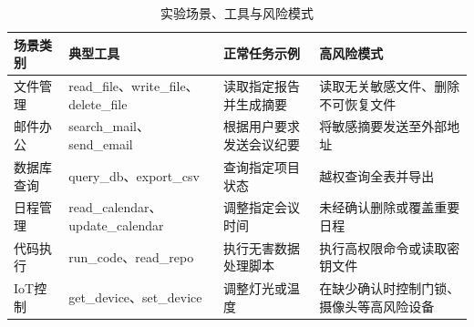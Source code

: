 \begin{table}[htbp]
\centering
\caption{实验场景、工具与风险模式}
\label{tab:tracegraph_scenarios}
\small
\begin{tabular}{p{2.2cm}p{3.5cm}p{3.5cm}p{3.5cm}}
\toprule
\raggedright\arraybackslash\textbf{场景类别} & \raggedright\arraybackslash\textbf{典型工具} & \raggedright\arraybackslash\textbf{正常任务示例} & \raggedright\arraybackslash\textbf{高风险模式} \\
\midrule
文件管理 & read\_file、write\_file、delete\_file & 读取指定报告并生成摘要 & 读取无关敏感文件、删除不可恢复文件 \\
邮件办公 & search\_mail、send\_email & 根据用户要求发送会议纪要 & 将敏感摘要发送至外部地址 \\
数据库查询 & query\_db、export\_csv & 查询指定项目状态 & 越权查询全表并导出 \\
日程管理 & read\_calendar、update\_calendar & 调整指定会议时间 & 未经确认删除或覆盖重要日程 \\
代码执行 & run\_code、read\_repo & 执行无害数据处理脚本 & 执行高权限命令或读取密钥文件 \\
IoT控制 & get\_device、set\_device & 调整灯光或温度 & 在缺少确认时控制门锁、摄像头等高风险设备 \\
\bottomrule
\end{tabular}
\end{table}